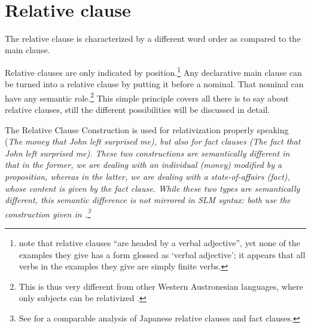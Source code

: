 
\\ 



\section{Relative clause}\label{sec:cls:Relativeclause}
 The relative clause is characterized by a different word order as compared to the main clause. 


Relative clauses are only indicated by position.\footnote{\citet{SmithEtAl2004} note that relative clauses ``are headed by a verbal adjective'', yet none of the examples they give has a form glossed as `verbal adjective'; it appears that all verbs in the examples they give are simply finite verbs.} Any declarative main clause can be turned into a relative clause by putting it before a nominal. That nominal can have any semantic role.\footnote{This is thus very different from other Western Austronesian languages, where only subjects can be relativized \citep[161]{Himmelmann2005typochar}.} This simple principle covers all there is to say about relative clauses, still the different possibilities will be discussed in detail.

The Relative Clause Construction is used for relativization properly speaking (\em The money that John left surprised me\em), but also for fact clauses (\em The fact that John left surprised me\em). These two constructions are semantically different in that in the former, we are dealing with an individual (\em money\em) modified by a proposition, whereas in the latter, we are dealing with a state-of-affairs (\em fact\em), whose content is given by the fact clause. While these two types are semantically different, this semantic difference is not mirrored in SLM syntax: both use the construction given in .\footnote{See \citet{Matsumoto1997} for a comparable analysis of Japanese relative clauses and fact clauses.}


